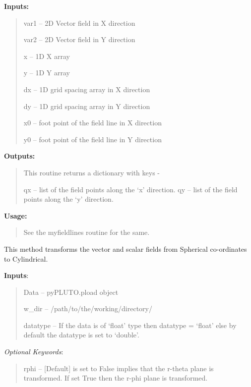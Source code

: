 \documentclass[letterpaper,10pt,english]{sphinxmanual}
\begin{document}
\begin{fulllineitems}
\begin{fulllineitems}
\textbf{Inputs:}
\begin{quote}

var1 -- 2D Vector field in X direction

var2 -- 2D Vector field in Y direction

x -- 1D X array

y -- 1D Y array

dx -- 1D grid spacing array in X direction

dy -- 1D grid spacing array in Y direction

x0 -- foot point of the field line in X direction

y0 -- foot point of the field line in Y direction
\end{quote}

\textbf{Outputs:}
\begin{quote}

This routine returns a dictionary with keys -

qx -- list of the field points along the `x' direction.
qy -- list of the field points along the `y' direction.
\end{quote}

\textbf{Usage:}
\begin{quote}

See the myfieldlines routine for the same.
\end{quote}

\end{fulllineitems}


\begin{fulllineitems}
\label{image:pyPLUTO.Image.getSphData}
This method transforms the vector and scalar  fields from Spherical co-ordinates to Cylindrical.

\textbf{Inputs}:
\begin{quote}

Data -- pyPLUTO.pload object

w\_dir -- /path/to/the/working/directory/

datatype -- If the data is of `float' type then datatype = `float' else by default the datatype is set to `double'.
\end{quote}

\emph{Optional Keywords}:
\begin{quote}

rphi -- {[}Default{]} is set to False implies that the r-theta plane is transformed. If set True then the r-phi plane is transformed.


\end{quote}
\end{fulllineitems}
\end{fulllineitems}
\end{document}
